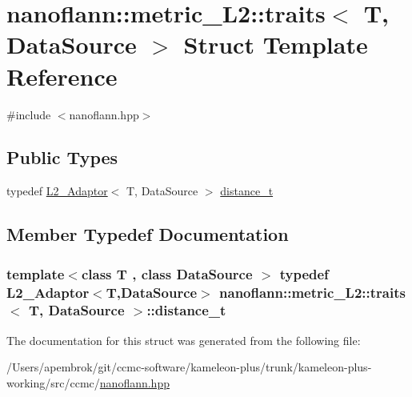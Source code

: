 \hypertarget{structnanoflann_1_1metric___l2_1_1traits}{\section{nanoflann\-:\-:metric\-\_\-\-L2\-:\-:traits$<$ T, Data\-Source $>$ Struct Template Reference}
\label{structnanoflann_1_1metric___l2_1_1traits}
}


{\ttfamily \#include $<$nanoflann.\-hpp$>$}

\subsection*{Public Types}
\begin{DoxyCompactItemize}
\item 
typedef \hyperlink{structnanoflann_1_1_l2___adaptor}{L2\-\_\-\-Adaptor}$<$ T, Data\-Source $>$ \hyperlink{structnanoflann_1_1metric___l2_1_1traits_a80415c5d579219cbf6c3ec33e5f35e79}{distance\-\_\-t}
\end{DoxyCompactItemize}


\subsection{Member Typedef Documentation}
\hypertarget{structnanoflann_1_1metric___l2_1_1traits_a80415c5d579219cbf6c3ec33e5f35e79}{
\subsubsection[{distance\-\_\-t}]{\setlength{\rightskip}{0pt plus 5cm}template$<$class T , class Data\-Source $>$ typedef {\bf L2\-\_\-\-Adaptor}$<$T,Data\-Source$>$ {\bf nanoflann\-::metric\-\_\-\-L2\-::traits}$<$ T, Data\-Source $>$\-::{\bf distance\-\_\-t}}}\label{structnanoflann_1_1metric___l2_1_1traits_a80415c5d579219cbf6c3ec33e5f35e79}


The documentation for this struct was generated from the following file\-:\begin{DoxyCompactItemize}
\item 
/\-Users/apembrok/git/ccmc-\/software/kameleon-\/plus/trunk/kameleon-\/plus-\/working/src/ccmc/\hyperlink{nanoflann_8hpp}{nanoflann.\-hpp}\end{DoxyCompactItemize}
